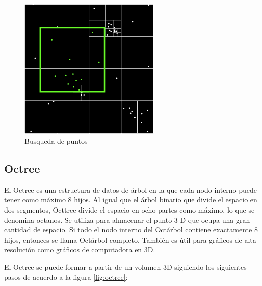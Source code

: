 \documentclass{article}
\begin{document}
\begin{figure}[h!]
	\centering
	\includegraphics[width=0.6\textwidth]{img/quadtree_search.png}
	\caption{Busqueda de puntos}
	\label{fig:quadtree_search}
\end{figure}
\clearpage
\subsection{Octree}

El Octree es una estructura de datos de árbol en la que cada nodo interno puede tener como máximo 8 hijos. Al igual que el árbol binario que divide el espacio en dos segmentos, Octtree divide el espacio en ocho partes como máximo, lo que se denomina octanos. Se utiliza para almacenar el punto 3-D que ocupa una gran cantidad de espacio. Si todo el nodo interno del Octárbol contiene exactamente 8 hijos, entonces se llama Octárbol completo. También es útil para gráficos de alta resolución como gráficos de computadora en 3D.

El Octree se puede formar a partir de un volumen 3D siguiendo los siguientes pasos de acuerdo a la figura \ref{fig:octree}:
\end{document}
